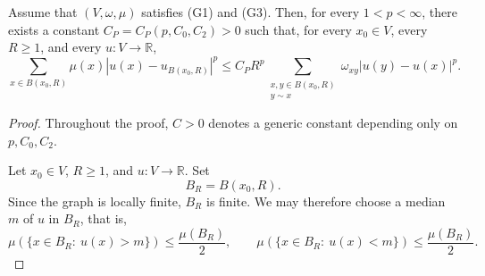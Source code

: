 \documentclass[10pt,a4paper]{amsart}
\begin{document}
\begin{lemma}\label{lem-local-poincare}
Assume that \((V,\omega,\mu)\) satisfies {\rm(G1)} and {\rm(G3)}. Then, for
every \(1<p<\infty\), there exists a constant \(C_P=C_P(p,C_0,C_2)>0\)
such that, for every \(x_0\in V\), every \(R\ge1\), and every
\(u:V\to\mathbb R\),
\begin{equation}\label{local-poincare}
\sum_{x\in B(x_0,R)}\mu(x)|u(x)-u_{B(x_0,R)}|^p
\le
C_P R^p
\sum_{\substack{x,y\in B(x_0,R)\\ y\sim x}}
\omega_{xy}|u(y)-u(x)|^p.
\end{equation}
\end{lemma}

\begin{proof}

Throughout the proof, \(C>0\) denotes a generic constant depending only on \(p,C_0,C_2\).


Let \(x_0\in V\), \(R\ge1\), and \(u:V\to\mathbb R\). Set
\[
B_R=B(x_0,R).
\]
Since the graph is locally finite, \(B_R\) is finite. We may therefore choose
a median \(m\) of \(u\) in \(B_R\), that is,
\[
\mu(\{x\in B_R:\ u(x)>m\})\le \frac{\mu(B_R)}{2},
\qquad
\mu(\{x\in B_R:\ u(x)<m\})\le \frac{\mu(B_R)}{2}.
\]


\end{proof}
\end{document}

